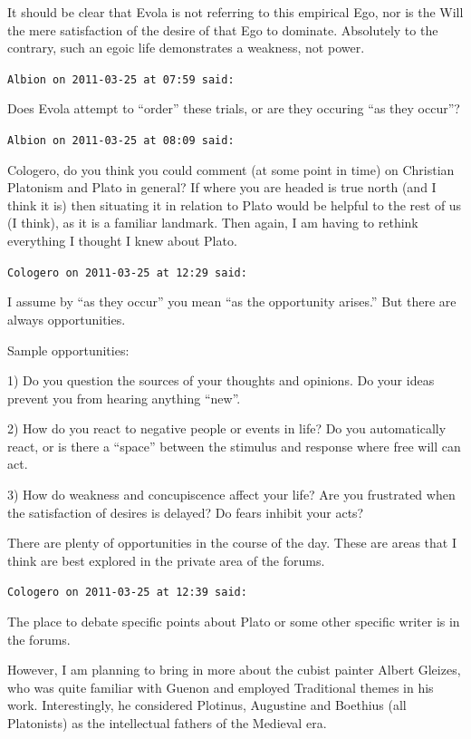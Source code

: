 \begin{footnotesize}
\begin{sffamily}
It should be clear that Evola is not referring to this empirical Ego, nor is the Will the mere satisfaction of the desire of that Ego to dominate. Absolutely to the contrary, such an egoic life demonstrates a weakness, not power.

\hfill

\texttt{Albion on 2011-03-25 at 07:59 said:}

Does Evola attempt to ``order'' these trials, or are they occuring ``as they occur''?

\hfill

\texttt{Albion on 2011-03-25 at 08:09 said:}

Cologero, do you think you could comment (at some point in time) on Christian Platonism and Plato in general? If where you are headed is true north (and I think it is) then situating it in relation to Plato would be helpful to the rest of us (I think), as it is a familiar landmark. Then again, I am having to rethink everything I thought I knew about Plato.

\hfill

\texttt{Cologero on 2011-03-25 at 12:29 said:}

I assume by ``as they occur'' you mean ``as the opportunity arises.'' But there are always opportunities.

Sample opportunities:

1) Do you question the sources of your thoughts and opinions. Do your ideas prevent you from hearing anything ``new''.

2) How do you react to negative people or events in life? Do you automatically react, or is there a ``space'' between the stimulus and response where free will can act.

3) How do weakness and concupiscence affect your life? Are you frustrated when the satisfaction of desires is delayed? Do fears inhibit your acts?

There are plenty of opportunities in the course of the day. These are areas that I think are best explored in the private area of the forums.

\hfill

\texttt{Cologero on 2011-03-25 at 12:39 said:}

The place to debate specific points about Plato or some other specific writer is in the forums.

However, I am planning to bring in more about the cubist painter Albert Gleizes, who was quite familiar with Guenon and employed Traditional themes in his work. Interestingly, he considered Plotinus, Augustine and Boethius (all Platonists) as the intellectual fathers of the Medieval era.


\end{sffamily}
\end{footnotesize}
